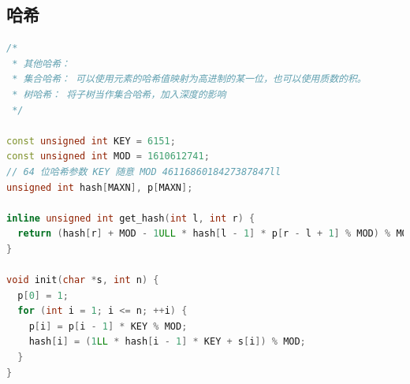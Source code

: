 \documentclass[twoside]{article}
\begin{document}
\subsection{哈希}
\begin{lstlisting}[language=c++]
/*
 * 其他哈希：
 * 集合哈希： 可以使用元素的哈希值映射为高进制的某一位，也可以使用质数的积。
 * 树哈希： 将子树当作集合哈希，加入深度的影响
 */

const unsigned int KEY = 6151;
const unsigned int MOD = 1610612741;
// 64 位哈希参数 KEY 随意 MOD 4611686018427387847ll
unsigned int hash[MAXN], p[MAXN];

inline unsigned int get_hash(int l, int r) {
  return (hash[r] + MOD - 1ULL * hash[l - 1] * p[r - l + 1] % MOD) % MOD;
}

void init(char *s, int n) {
  p[0] = 1;
  for (int i = 1; i <= n; ++i) {
    p[i] = p[i - 1] * KEY % MOD;
    hash[i] = (1LL * hash[i - 1] * KEY + s[i]) % MOD;
  }
}

\end{lstlisting}
\end{document}
